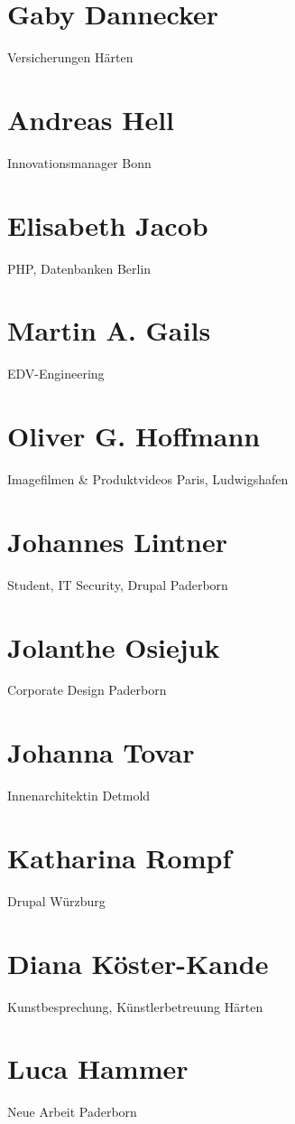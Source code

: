 \begin{appendix}
\section{Gaby Dannecker}
Versicherungen
Härten

\section{Andreas Hell}
Innovationsmanager
Bonn


\section{Elisabeth Jacob}
PHP, Datenbanken
Berlin


\section{Martin A. Gails}
EDV-Engineering


\section{Oliver G. Hoffmann}
Imagefilmen \& Produktvideos
Paris, Ludwigshafen

\section{Johannes Lintner}
Student, IT Security, Drupal
Paderborn

\section{Jolanthe Osiejuk}
Corporate Design
Paderborn

\section{Johanna Tovar}
Innenarchitektin
Detmold

\section{Katharina Rompf}
Drupal
Würzburg

\section{Diana Köster-Kande}
Kunstbesprechung, Künstlerbetreuung
Härten

\section{Luca Hammer}
Neue Arbeit
Paderborn


\end{appendix}
